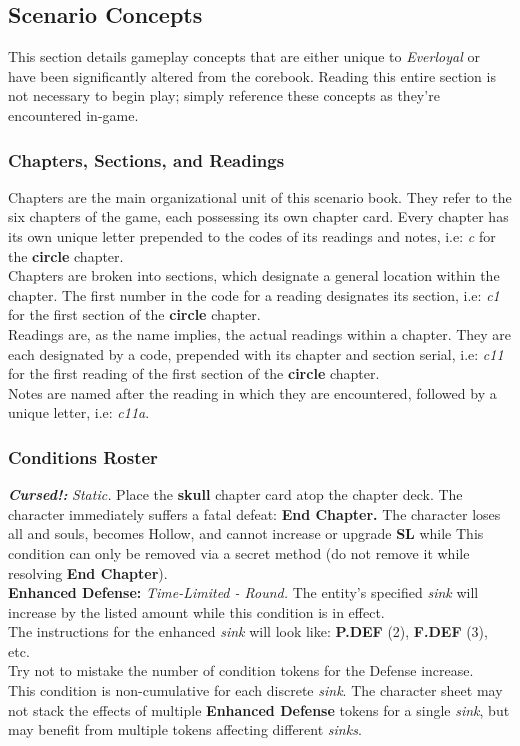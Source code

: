 \documentclass[12pt]{article}
\begin{document}
\begin{multicols*}{2}
\subsection{Scenario Concepts}
This section details gameplay concepts that are either unique to \emph{Everloyal} or have been significantly altered from the corebook. Reading this entire section is not necessary to begin play; simply reference these concepts as they’re encountered in-game.

\subsubsection{Chapters, Sections, and Readings}
Chapters are the main organizational unit of this scenario book. They refer to the six chapters of the game, each possessing its own chapter card. Every chapter has its own unique letter prepended to the codes of its readings and notes, i.e: \emph{c} for the \textbf{circle} chapter.\\
Chapters are broken into sections, which designate a general location within the chapter. The first number in the code for a reading designates its section, i.e: \emph{c1} for the first section of the \textbf{circle} chapter.\\
Readings are, as the name implies, the actual readings within a chapter. They are each designated by a code, prepended with its chapter and section serial, i.e: \emph{c11} for the first reading of the first section of the \textbf{circle} chapter.\\
Notes are named after the reading in which they are encountered, followed by a unique letter, i.e: \emph{c11a}.

\subsubsection{Conditions Roster}
\textbf{\emph{Cursed!:}} \hypertarget{Cursed!}{}\emph{Static.} Place the \textbf{skull} chapter card atop the chapter deck. The character immediately suffers a fatal defeat: \textbf{End Chapter.} The character loses all  and souls, becomes Hollow, and cannot increase  or upgrade \textbf{SL} while  This condition can only be removed via a secret method (do not remove it while resolving \textbf{End Chapter}).\\

\textbf{Enhanced Defense:} \emph{Time-Limited - Round.} The entity’s specified \emph{sink} will increase by the listed amount while this condition is in effect.\\
The instructions for the enhanced \emph{sink} will look like: \textbf{P.DEF} (2), \textbf{F.DEF} (3), etc.\\
Try not to mistake the number of condition tokens for the Defense increase.\\
This condition is non-cumulative for each discrete \emph{sink}. The character sheet may not stack the effects of multiple \textbf{Enhanced Defense} tokens for a single \emph{sink}, but may benefit from multiple tokens affecting different \emph{sinks}.


\end{multicols*}
\end{document}

